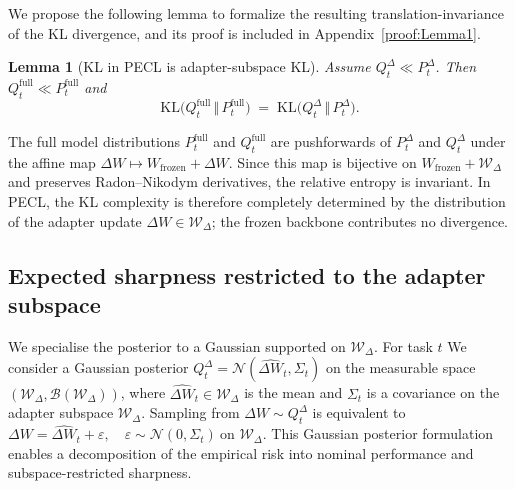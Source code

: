\documentclass{article}
\theoremstyle{plain}
\newtheorem{lemma}[theorem]{Lemma}
\theoremstyle{definition}
\theoremstyle{remark}
\begin{document}
We propose the following lemma to formalize the resulting translation-invariance of the KL divergence, and its proof is included in Appendix~\ref{proof:Lemma1}.
\begin{lemma}[KL in PECL is adapter-subspace KL]
\label{lem:kl-decomp-pecl}
Assume $Q_t^\Delta \ll P_t^\Delta$. Then $Q_t^{\mathrm{full}} \ll P_t^{\mathrm{full}}$ and
$$
\mathrm{KL}\bigl(Q_t^{\mathrm{full}} \,\Vert\, P_t^{\mathrm{full}}\bigr)
\;=\;
\mathrm{KL}\bigl(Q_t^\Delta \,\Vert\, P_t^\Delta\bigr).
$$
\end{lemma}
The full model distributions $P_t^{\mathrm{full}}$ and $Q_t^{\mathrm{full}}$ are pushforwards of $P_t^\Delta$ and $Q_t^\Delta$ under the affine map $\Delta W \mapsto W_{\mathrm{frozen}} + \Delta W$. Since this map is bijective on $W_{\mathrm{frozen}} + \mathcal W_\Delta$ and preserves Radon–Nikodym derivatives, the relative entropy is invariant. In PECL, the KL complexity is therefore completely determined by the distribution of the adapter update $\Delta W\in\mathcal W_\Delta$; the frozen backbone contributes no divergence.

\subsection{Expected sharpness restricted to the adapter subspace}
\label{sec:subspace-sharpness-pecl}

We specialise the posterior to a Gaussian supported on $\mathcal W_\Delta$. For task $t$ We consider a Gaussian posterior \( Q_t^{\Delta} = \mathcal{N}(\hat{\Delta W}_t, \Sigma_t) \) on the measurable space \( (\mathcal{W}_\Delta, \mathcal{B}(\mathcal{W}_\Delta)) \), where \( \hat{\Delta W}_t \in \mathcal{W}_\Delta \) is the mean and \( \Sigma_t\) is a covariance on the adapter subspace \( \mathcal{W}_\Delta \). Sampling from \( \Delta W \sim Q_t^{\Delta} \) is equivalent to 
$
\Delta W = \hat{\Delta W}_t + \varepsilon, \quad \varepsilon \sim \mathcal{N}(0, \Sigma_t) \ \text{on } \mathcal{W}_\Delta.
$ This Gaussian posterior formulation enables a decomposition of the empirical risk into nominal performance and subspace-restricted sharpness.
\end{document}
